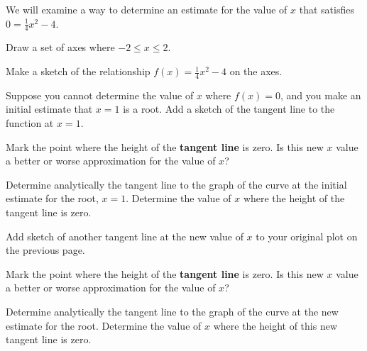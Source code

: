 \begin{problem}
\item We will examine a way to determine an estimate for the value of
  $x$ that satisfies $0=\frac{1}{4}x^2-4$.
  \begin{subproblem}
  \item Draw a set of axes where $-2\leq x \leq 2$. 


    \vfill

  \item Make a sketch of the relationship $f(x)=\frac{1}{4}x^2-4$ on the axes.
  \item Suppose you cannot determine the value of $x$ where $f(x)=0$,
    and you make an initial estimate that $x=1$ is a root. Add a
    sketch of the tangent line to the function at $x=1$.

  \item Mark the point where the height of the \textbf{tangent line}
    is zero. Is this new $x$ value a better or worse approximation for the value of
    $x$?  

    \vspace{2em}

    \clearpage


  \item Determine analytically the tangent line to the graph of the
    curve at the initial estimate for the root, $x=1$. Determine the
    value of $x$ where the height of the tangent line is zero.

    \vfill


  \item Add sketch of another tangent line at the new value of $x$ to
    your original plot on the previous page. 

  \item Mark the point where the height of the \textbf{tangent line}
    is zero. Is this new $x$ value a better or worse approximation for the value of
    $x$?  

    \vspace{2em}

  \item Determine analytically the tangent line to the graph of the
    curve at the new estimate for the root. Determine the value of $x$
    where the height of this new tangent line is zero.

    \vfill



\end{subproblem}
\end{problem}
